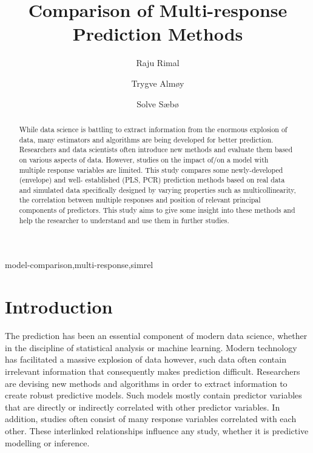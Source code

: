 \documentclass[review]{elsarticle}
\begin{document}
\begin{frontmatter}

  \title{Comparison of Multi-response Prediction Methods}
  
    \author[KBM]{Raju Rimal}
    \author[KBM]{Trygve Almøy}
  
    \author[NMBU]{Solve Sæbø}
  
      \address[KBM]{Faculty of Chemistry and Bioinformatics, Norwegian University of Life
Sciences, Ås, Norway}
    \address[NMBU]{Professor, Norwegian University of Life Sciences, Ås, Norway}
  
  \begin{abstract}
  While data science is battling to extract information from the enormous
  explosion of data, many estimators and algorithms are being developed
  for better prediction. Researchers and data scientists often introduce
  new methods and evaluate them based on various aspects of data. However,
  studies on the impact of/on a model with multiple response variables are
  limited. This study compares some newly-developed (envelope) and well-
  established (PLS, PCR) prediction methods based on real data and
  simulated data specifically designed by varying properties such as
  multicollinearity, the correlation between multiple responses and
  position of relevant principal components of predictors. This study aims
  to give some insight into these methods and help the researcher to
  understand and use them in further studies.
  \end{abstract}
   \begin{keyword} model-comparison,multi-response,simrel\end{keyword}

\end{frontmatter}

\section{Introduction}\label{introduction}

The prediction has been an essential component of modern data science,
whether in the discipline of statistical analysis or machine learning.
Modern technology has facilitated a massive explosion of data however,
such data often contain irrelevant information that consequently makes
prediction difficult. Researchers are devising new methods and
algorithms in order to extract information to create robust predictive
models. Such models mostly contain predictor variables that are directly
or indirectly correlated with other predictor variables. In addition,
studies often consist of many response variables correlated with each
other. These interlinked relationships influence any study, whether it
is predictive modelling or inference.
\end{document}
